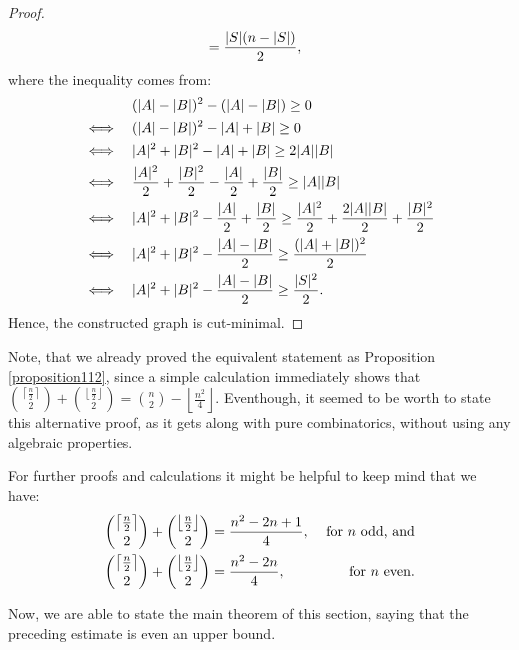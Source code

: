 \begin{prop}
\begin{proof}
\begin{align}
&=\frac{|S|(n-|S|)}{2},\notag
\end{align}
where the inequality comes from:
\begin{align}
&\quad\quad\quad\:\, (|A|-|B|)^2-(|A|-|B|)\geq 0\notag\\
&\Longleftrightarrow\quad (|A|-|B|)^2-|A|+|B|\geq 0\notag\\
&\Longleftrightarrow\quad |A|^2+|B|^2-|A|+|B|\geq 2|A||B|\notag\\
&\Longleftrightarrow\quad \frac{|A|^2}{2}+\frac{|B|^2}{2}-\frac{|A|}{2}+\frac{|B|}{2}\geq |A||B|\notag\\
&\Longleftrightarrow\quad |A|^2+|B|^2-\frac{|A|}{2}+\frac{|B|}{2}\geq \frac{|A|^2}{2}+\frac{2|A||B|}{2}+\frac{|B|^2}{2}\notag\\
&\Longleftrightarrow\quad |A|^2+|B|^2-\frac{|A|-|B|}{2}\geq\frac{(|A|+|B|)^2}{2}\notag\\
&\Longleftrightarrow\quad |A|^2+|B|^2-\frac{|A|-|B|}{2}\geq\frac{|S|^2}{2}.\notag
\end{align}
Hence, the constructed graph is cut-minimal.
\end{proof}
\end{prop}

Note, that we already proved the equivalent statement as Proposition \ref{proposition112}, since a simple calculation immediately shows that \(\binom{\left\lceil\frac{n}{2}\right\rceil}{2}+\binom{\left\lfloor\frac{n}{2}\right\rfloor}{2}=\binom{n}{2}-\left\lfloor\frac{n^2}{4}\right\rfloor\). Eventhough, it seemed to be worth to state this alternative proof, as it gets along with pure combinatorics, without using any algebraic properties.

\begin{rem}
For further proofs and calculations it might be helpful to keep mind that we have:
\begin{align}
&\binom{\left\lceil\frac{n}{2}\right\rceil}{2}+\binom{\left\lfloor\frac{n}{2}\right\rfloor}{2}=\frac{n^2-2n+1}{4},&\text{ for }n\text{ odd, and}\notag \\
&\binom{\left\lceil\frac{n}{2}\right\rceil}{2}+\binom{\left\lfloor\frac{n}{2}\right\rfloor}{2}=\frac{n^2-2n}{4},&\text{ for }n\text{ even.}\notag
\end{align}
\end{rem}

Now, we are able to state the main theorem of this section, saying that the preceding estimate is even an upper bound.

